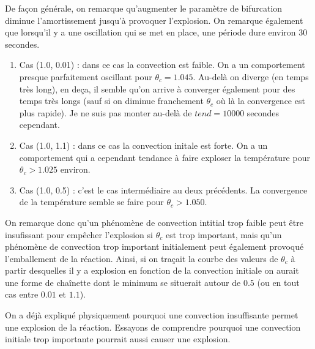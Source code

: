 \documentclass[10pt,a4paper,twocolumn]{report}
\begin{document}
De façon générale, on remarque qu'augmenter le paramètre de bifurcation diminue l'amortissement jusqu'à provoquer l'explosion. On remarque également que lorsqu'il y a une oscillation qui se met en place, une période dure environ 30 secondes.	

\begin{enumerate}
	\item Cas (1.0, 0.01) : dans ce cas la convection est faible. On a un comportement presque parfaitement oscillant pour $\theta_c = 1.045$. Au-delà on diverge (en temps très long), en deça, il semble qu'on arrive à converger également pour des temps très longs (sauf si on diminue franchement $\theta_c$ où là la convergence est plus rapide). Je ne suis pas monter au-delà de $tend = 10000$ secondes cependant.
	\item Cas (1.0, 1.1) : dans ce cas la convection initale est forte. On a un comportement qui a cependant tendance à faire exploser la température pour  $\theta_c > 1.025$ environ.
	\item Cas (1.0, 0.5) : c'est le cas intermédiaire au deux précédents. La convergence de la température semble se faire pour $\theta_c > 1.050$. 
\end{enumerate}

On remarque donc qu'un phénomène de convection intitial trop faible peut être insufissant pour empêcher l'explosion si $\theta_c$ est trop important, mais qu'un phénomène de convection trop important initialement peut également provoqué l'emballement de la réaction. Ainsi, si on traçait la courbe des valeurs de $\theta_c$ à partir desquelles il y a explosion en fonction de la convection initiale on aurait une forme de chaînette dont le minimum se situerait autour de $0.5$ (ou en tout cas entre $0.01$ et $1.1$).

On a déjà expliqué physiquement pourquoi une convection insuffisante permet une explosion de la réaction. Essayons de comprendre pourquoi une convection initiale trop importante pourrait aussi causer une explosion.
\subsubsection{} %
\end{document}
